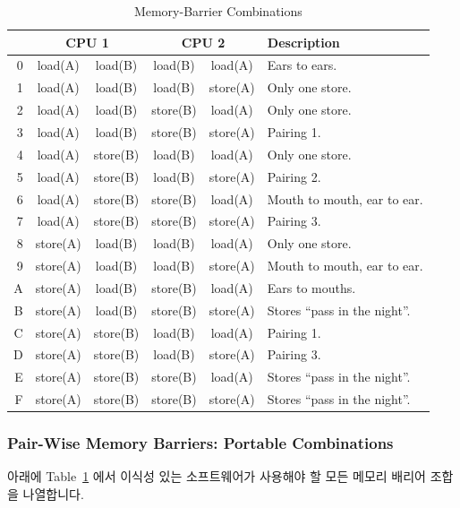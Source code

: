 \begin{table}
\small
\centering
\begin{tabular}{r||c|c||c|c||l}
	\multicolumn{1}{c||}{} & \multicolumn{2}{c||}{CPU 1} &
		\multicolumn{2}{c||}{CPU 2} & Description \\
	\hline
	\hline
	0 & load(A) & load(B) & load(B) & load(A) &
		Ears to ears. \\
	1 & load(A) & load(B) & load(B) & store(A) &
		Only one store. \\
	2 & load(A) & load(B) & store(B) & load(A) &
		Only one store. \\
	3 & load(A) & load(B) & store(B) & store(A) &
		Pairing 1. \\
	\hline
	4 & load(A) & store(B) & load(B) & load(A) &
		Only one store. \\
	5 & load(A) & store(B) & load(B) & store(A) &
		Pairing 2. \\
	6 & load(A) & store(B) & store(B) & load(A) &
		Mouth to mouth, ear to ear. \\
	7 & load(A) & store(B) & store(B) & store(A) &
		Pairing 3. \\
	\hline
	8 & store(A) & load(B) & load(B) & load(A) &
		Only one store. \\
	9 & store(A) & load(B) & load(B) & store(A) &
		Mouth to mouth, ear to ear. \\
	A & store(A) & load(B) & store(B) & load(A) &
		Ears to mouths. \\
	B & store(A) & load(B) & store(B) & store(A) &
		Stores ``pass in the night''. \\
	\hline
	C & store(A) & store(B) & load(B) & load(A) &
		Pairing 1. \\
	D & store(A) & store(B) & load(B) & store(A) &
		Pairing 3. \\
	E & store(A) & store(B) & store(B) & load(A) &
		Stores ``pass in the night''. \\
	F & store(A) & store(B) & store(B) & store(A) &
		Stores ``pass in the night''. \\
\end{tabular}
\caption{Memory-Barrier Combinations}
\label{tab:advsync:Memory-Barrier Combinations}
\end{table}

\subsubsection{Pair-Wise Memory Barriers: Portable Combinations}

아래에 Table~\ref{tab:advsync:Memory-Barrier Combinations} 에서 이식성 있는
소프트웨어가 사용해야 할 모든 메모리 배리어 조합을 나열합니다.
\iffalse

